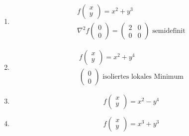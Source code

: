 \begin{bsp*}[note = ausgeartete kritische Punkte]
	\begin{enumerate}[label = \alph*)]
		\item
			\begin{gather*}
				f\begin{pmatrix} x \\ y \end{pmatrix} = x^2 + y^3 \\
				\nabla^2 f\begin{pmatrix} 0 \\ 0 \end{pmatrix} = \begin{pmatrix} 2 & 0 \\ 0 & 0 \end{pmatrix} \text{ semidefinit}
			\end{gather*}
		\item
			\begin{gather*}
				f\begin{pmatrix} x \\ y \end{pmatrix} = x^2 + y^4 \\
				\begin{pmatrix} 0 \\ 0 \end{pmatrix} \text{ isoliertes lokales Minimum}
			\end{gather*}
		\item \[ f\begin{pmatrix} x \\ y \end{pmatrix} = x^2 - y^4 \]
		\item \[ f\begin{pmatrix} x \\ y \end{pmatrix} = x^3 + y^3 \]
	\end{enumerate}
\end{bsp*}
